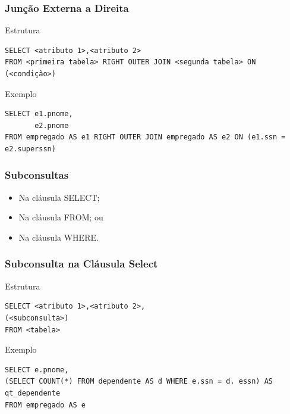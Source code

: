 \documentclass{beamer}
\begin{document}
\begin{frame}[fragile]
\frametitle{Junção Externa a Direita}

\begin{block}{Estrutura}
	\begin{lstlisting}
SELECT <atributo 1>,<atributo 2>
FROM <primeira tabela> RIGHT OUTER JOIN <segunda tabela> ON (<condição>)
	\end{lstlisting}
\end{block}\vfill

\begin{exampleblock}{Exemplo}
	\begin{lstlisting}
SELECT e1.pnome,
       e2.pnome
FROM empregado AS e1 RIGHT OUTER JOIN empregado AS e2 ON (e1.ssn = e2.superssn)
\end{lstlisting}
\end{exampleblock}
\end{frame}

\begin{frame}
\frametitle{Subconsultas}

\begin{itemize}
	\item Na cláusula SELECT;
	\item Na cláusula FROM; ou
	\item Na cláusula WHERE.
\end{itemize}
\end{frame}

\begin{frame}[fragile]
\frametitle{Subconsulta na Cláusula Select}

\begin{block}{Estrutura}
	\begin{lstlisting}
SELECT <atributo 1>,<atributo 2>,
(<subconsulta>)
FROM <tabela>	
	\end{lstlisting}
\end{block}\vfill

\begin{exampleblock}{Exemplo}
	\begin{lstlisting}
SELECT e.pnome,
(SELECT COUNT(*) FROM dependente AS d WHERE e.ssn = d. essn) AS qt_dependente
FROM empregado AS e	
	\end{lstlisting}
\end{exampleblock}
\end{frame}
\end{document}
